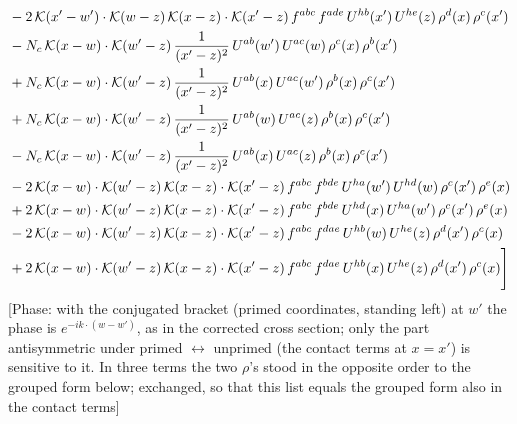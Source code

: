 \documentclass[9pt]{article}
\numberwithin{equation}{section}
\begin{document}
\begin{align}
&-2\,\mathcal{K}(x'-w')\cdot\mathcal{K}(w-z)\,\mathcal{K}(x-z)\cdot\mathcal{K}(x'-z)\,f^{abc}\,f^{ade}\,U^{hb}(x')\,U^{he}(z)\,\rho^{d}(x)\,\rho^{c}(x')\notag\\
&-N_{c}\,\mathcal{K}(x-w)\cdot\mathcal{K}(w'-z)\,\frac{1}{(x'-z)^{2}}\,U^{ab}(w')\,U^{ac}(w)\,\rho^{c}(x)\,\rho^{b}(x')\notag \\ & +N_{c}\,\mathcal{K}(x-w)\cdot\mathcal{K}(w'-z)\,\frac{1}{(x'-z)^{2}}\,U^{ab}(x)\,U^{ac}(w')\,\rho^{b}(x)\,\rho^{c}(x')\notag\\
&+N_{c}\,\mathcal{K}(x-w)\cdot\mathcal{K}(w'-z)\,\frac{1}{(x'-z)^{2}}\,U^{ab}(w)\,U^{ac}(z)\,\rho^{b}(x)\,\rho^{c}(x')\notag\\
&-N_{c}\,\mathcal{K}(x-w)\cdot\mathcal{K}(w'-z)\,\frac{1}{(x'-z)^{2}}\,U^{ab}(x)\,U^{ac}(z)\,\rho^{b}(x)\,\rho^{c}(x')\notag\\
&-2\,\mathcal{K}(x-w)\cdot\mathcal{K}(w'-z)\,\mathcal{K}(x-z)\cdot\mathcal{K}(x'-z)\,f^{abc}\,f^{bde}\,U^{ha}(w')\,U^{hd}(w)\,\rho^{c}(x')\,\rho^{e}(x)\notag\\
&+2\,\mathcal{K}(x-w)\cdot\mathcal{K}(w'-z)\,\mathcal{K}(x-z)\cdot\mathcal{K}(x'-z)\,f^{abc}\,f^{bde}\,U^{hd}(x)\,U^{ha}(w')\,\rho^{c}(x')\,\rho^{e}(x)\notag\\
&-2\,\mathcal{K}(x-w)\cdot\mathcal{K}(w'-z)\,\mathcal{K}(x-z)\cdot\mathcal{K}(x'-z)\,f^{abc}\,f^{dae}\,U^{hb}(w)\,U^{he}(z)\,\rho^{d}(x')\,\rho^{c}(x)\notag\\
&+2\,\mathcal{K}(x-w)\cdot\mathcal{K}(w'-z)\,\mathcal{K}(x-z)\cdot\mathcal{K}(x'-z)\,f^{abc}\,f^{dae}\,U^{hb}(x)\,U^{he}(z)\,\rho^{d}(x')\,\rho^{c}(x)\Bigg]
\end{align} {\color{red}[Phase: with the conjugated bracket (primed coordinates, standing left) at $w'$ the phase is $e^{-ik\cdot(w-w')}$, as in the corrected cross section; only the part antisymmetric under primed $\leftrightarrow$ unprimed (the contact terms at $x=x'$) is sensitive to it. In three terms the two $\rho$'s stood in the opposite order to the grouped form below; exchanged, so that this list equals the grouped form also in the contact terms]}\par\noindent 
\end{document}
